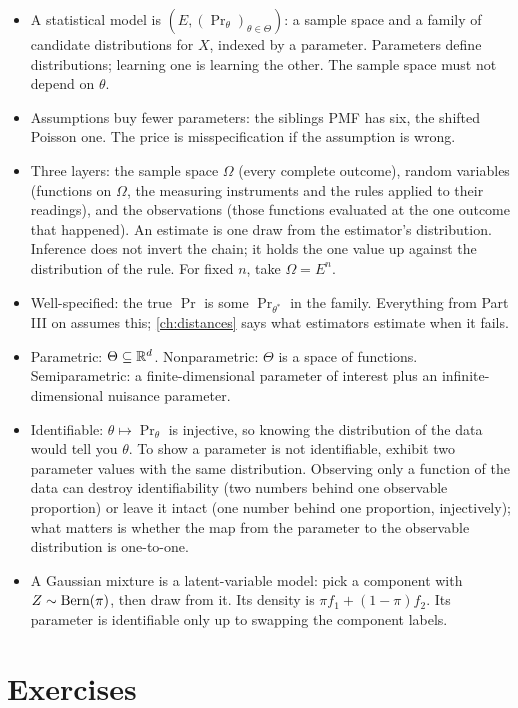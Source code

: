 \begin{itemize}[nosep]
\item A statistical model is $\left( E, (\Pr_\theta)_{\theta \in \Theta} \right)$: a sample space and a family of candidate distributions for $X$, indexed by a parameter. Parameters define distributions; learning one is learning the other. The sample space must not depend on $\theta$.
\item Assumptions buy fewer parameters: the siblings PMF has six, the shifted Poisson one. The price is misspecification if the assumption is wrong.
\item Three layers: the sample space $\Omega$ (every complete outcome), random variables (functions on $\Omega$, the measuring instruments and the rules applied to their readings), and the observations (those functions evaluated at the one outcome that happened). An estimate is one draw from the estimator's distribution. Inference does not invert the chain; it holds the one value up against the distribution of the rule. For fixed $n$, take $\Omega = E^n$.
\item Well-specified: the true $\Pr$ is some $\Pr_{\theta^*}$ in the family. Everything from Part III on assumes this; \cref{ch:distances} says what estimators estimate when it fails.
\item Parametric: $\Theta \subseteq \mathbb{R}^d$. Nonparametric: $\Theta$ is a space of functions. Semiparametric: a finite-dimensional parameter of interest plus an infinite-dimensional nuisance parameter.
\item Identifiable: $\theta \mapsto \Pr_\theta$ is injective, so knowing the distribution of the data would tell you $\theta$. To show a parameter is not identifiable, exhibit two parameter values with the same distribution. Observing only a function of the data can destroy identifiability (two numbers behind one observable proportion) or leave it intact (one number behind one proportion, injectively); what matters is whether the map from the parameter to the observable distribution is one-to-one.
\item A Gaussian mixture is a latent-variable model: pick a component with $Z \sim \text{Bern}(\pi)$, then draw from it. Its density is $\pi f_1 + (1-\pi) f_2$. Its parameter is identifiable only up to swapping the component labels.
\end{itemize}

\section{Exercises}
\label{sec:models-exercises}

